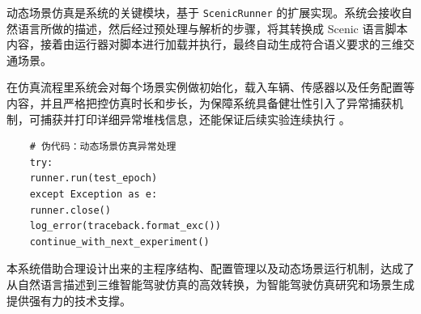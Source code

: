 动态场景仿真是系统的关键模块，基于 \texttt{ScenicRunner} 的扩展实现。系统会接收自然语言所做的描述，然后经过预处理与解析的步骤，将其转换成 Scenic 语言脚本内容，接着由运行器对脚本进行加载并执行，最终自动生成符合语义要求的三维交通场景。

在仿真流程里系统会对每个场景实例做初始化，载入车辆、传感器以及任务配置等内容，并且严格把控仿真时长和步长，为保障系统具备健壮性引入了异常捕获机制，可捕获并打印详细异常堆栈信息，还能保证后续实验连续执行 。

\begin{verbatim}
	# 伪代码：动态场景仿真异常处理
	try:
	runner.run(test_epoch)
	except Exception as e:
	runner.close()
	log_error(traceback.format_exc())
	continue_with_next_experiment()
\end{verbatim}

本系统借助合理设计出来的主程序结构、配置管理以及动态场景运行机制，达成了从自然语言描述到三维智能驾驶仿真的高效转换，为智能驾驶仿真研究和场景生成提供强有力的技术支撑。
